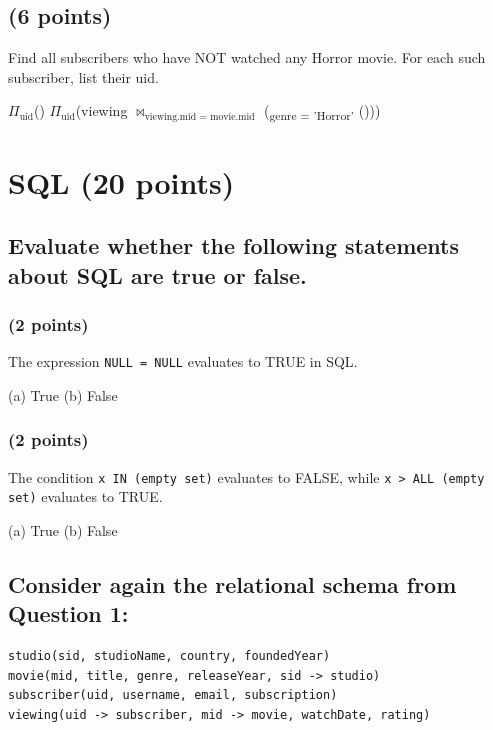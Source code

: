 \documentclass[11pt,a4paper]{article}
\begin{document}
\vspace{1em}

\subsection{(6 points)}
Find all subscribers who have NOT watched any Horror movie. For each such subscriber, list their uid.

\begin{center}
$\Pi_{\text{uid}}$()  $\Pi_{\text{uid}}$(viewing $\bowtie_{\text{viewing.mid = movie.mid}}$ (\textsubscript{genre = 'Horror'} ()))
\end{center}

\newpage

\section{SQL (20 points)}

\subsection{Evaluate whether the following statements about SQL are true or false.}

\subsubsection{(2 points)}
The expression \texttt{NULL = NULL} evaluates to TRUE in SQL.

(a) True \quad\quad (b) False

\subsubsection{(2 points)}
The condition \texttt{x IN (empty set)} evaluates to FALSE, while \texttt{x > ALL (empty set)} evaluates to TRUE.

(a) True \quad\quad (b) False

\subsection{Consider again the relational schema from Question 1:}

\begin{verbatim}
studio(sid, studioName, country, foundedYear)
movie(mid, title, genre, releaseYear, sid -> studio)
subscriber(uid, username, email, subscription)
viewing(uid -> subscriber, mid -> movie, watchDate, rating)
\end{verbatim}
\end{document}
